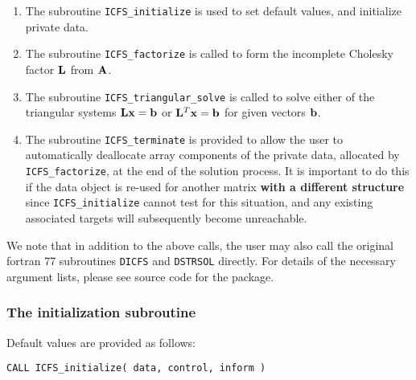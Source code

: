 \documentclass{galahad}
\newcommand{\packagename}{ICFS}
\begin{document}
\begin{enumerate}
\item The subroutine
      {\tt \packagename\_initialize}
      is used to set default values, and initialize private data.
\item The subroutine
      {\tt \packagename\_factorize}
      is called to form the incomplete Cholesky factor ${\mathbf{L}}$ from ${\mathbf{A}}$.
\item The subroutine
      {\tt \packagename\_triangular\_solve}
      is called to solve either of the triangular systems
      ${\mathbf{L}} {\mathbf{x}} = {\mathbf{b}}$ or ${\mathbf{L}}^T {\mathbf{x}} = {\mathbf{b}}$
      for given vectors ${\mathbf{b}}$.
\item The subroutine
      {\tt \packagename\_terminate}
      is provided to allow the user to automatically deallocate array
       components of the private data, allocated by
       {\tt \packagename\_factorize},
       at the end of the solution process.
       It is important to do this if the data object is re-used for another
       matrix {\bf with a different structure}
       since {\tt \packagename\_initialize} cannot test for this situation,
       and any existing associated targets will subsequently become unreachable.
\end{enumerate}

\noindent
We note that in addition to the above calls, the user may also call the
original fortran 77 subroutines {\tt DICFS} and {\tt DSTRSOL} directly.
For details of the necessary argument lists, please see source code
for the package.



\subsubsection{The initialization subroutine}\label{subinit}
 Default values are provided as follows:
\vspace*{1mm}

\hspace{8mm}
{\tt CALL \packagename\_initialize( data, control, inform )}
\end{document}
